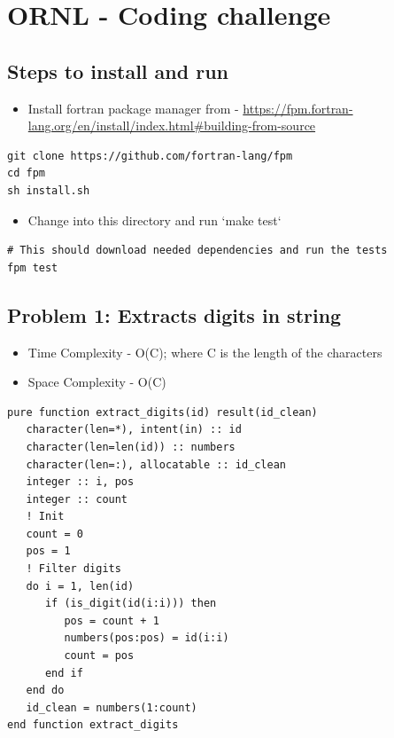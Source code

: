 \documentclass[11pt]{article}
\author{arul}
\date{\today}
\title{}
\begin{document}
\tableofcontents

\section{ORNL - Coding challenge}
\label{sec:org0b55527}
\subsection{Steps to install and run}
\label{sec:orgc7eaff6}
\begin{itemize}
\item Install fortran package manager from - \url{https://fpm.fortran-lang.org/en/install/index.html\#building-from-source}
\end{itemize}
\begin{verbatim}
git clone https://github.com/fortran-lang/fpm
cd fpm
sh install.sh
\end{verbatim}
\begin{itemize}
\item Change into this directory and run `make test`
\end{itemize}
\begin{verbatim}
# This should download needed dependencies and run the tests
fpm test
\end{verbatim}
\subsection{Problem 1: Extracts digits in string}
\label{sec:org6122352}
\begin{itemize}
\item Time Complexity - O(C); where C is the length of the characters
\item Space Complexity - O(C)
\end{itemize}
\begin{verbatim}
pure function extract_digits(id) result(id_clean)
   character(len=*), intent(in) :: id
   character(len=len(id)) :: numbers
   character(len=:), allocatable :: id_clean
   integer :: i, pos
   integer :: count
   ! Init
   count = 0
   pos = 1
   ! Filter digits
   do i = 1, len(id)
      if (is_digit(id(i:i))) then
         pos = count + 1
         numbers(pos:pos) = id(i:i)
         count = pos
      end if
   end do
   id_clean = numbers(1:count)
end function extract_digits
\end{verbatim}
\end{document}
